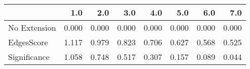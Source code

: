 \begin{tabular}{lrrrrrrr}
\toprule
{} &   1.0 &   2.0 &   3.0 &   4.0 &   5.0 &   6.0 &   7.0 \\
\midrule
No Extension & 0.000 & 0.000 & 0.000 & 0.000 & 0.000 & 0.000 & 0.000 \\
EdgesScore   & 1.117 & 0.979 & 0.823 & 0.706 & 0.627 & 0.568 & 0.525 \\
Significance & 1.058 & 0.748 & 0.517 & 0.307 & 0.157 & 0.089 & 0.044 \\
\bottomrule
\end{tabular}
